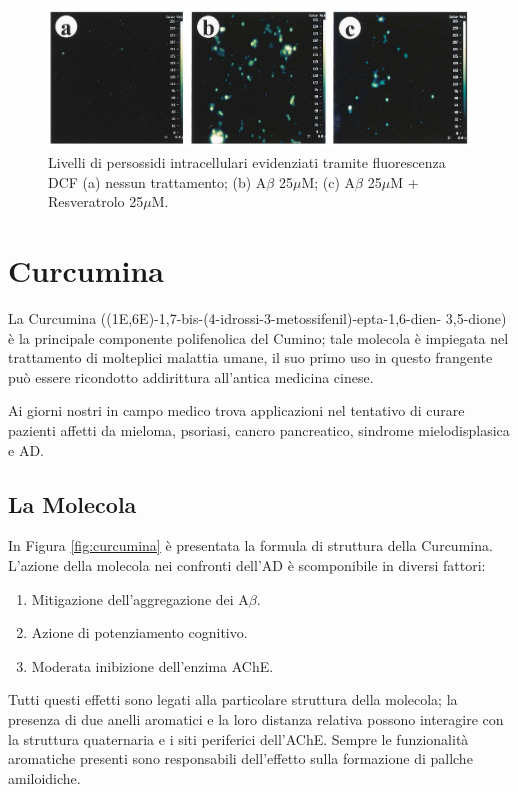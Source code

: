 \documentclass[a4paper, 12pt]{article}
\begin{document}
\begin{figure}[H]
	\centering
	\includegraphics[width=\linewidth]{immagini/roi_resveratrolo.png}
	\caption{Livelli di persossidi intracellulari evidenziati tramite fluorescenza DCF (a) nessun trattamento; (b) A$\beta$ 25$\mu$M; (c) A$\beta$ 25$\mu$M + Resveratrolo 25$\mu$M.}
	\label{fig:roi_resveratrolo}
\end{figure}

\section{Curcumina}
\label{sec:curc}
La Curcumina ((1E,6E)-1,7-bis-(4-idrossi-3-metossifenil)-epta-1,6-dien- 3,5-dione) è la principale componente polifenolica del Cumino; tale molecola è impiegata nel trattamento di molteplici malattia umane, il suo primo uso in questo frangente può essere ricondotto addirittura all'antica medicina cinese.

Ai giorni nostri in campo medico trova applicazioni nel tentativo di curare pazienti affetti da mieloma, psoriasi, cancro pancreatico, sindrome mielodisplasica e AD.

\subsection{La Molecola}
In Figura \ref{fig:curcumina} è presentata la formula di struttura della Curcumina. L'azione della molecola nei confronti dell'AD è scomponibile in diversi fattori:

\begin{enumerate}
	\item Mitigazione dell'aggregazione dei A$\beta$.
	\item Azione di potenziamento cognitivo.
	\item Moderata inibizione dell'enzima AChE.
\end{enumerate}

Tutti questi effetti sono legati alla particolare struttura della molecola; la presenza di due anelli aromatici e la loro distanza relativa possono interagire con la struttura quaternaria  e i siti periferici dell'AChE. Sempre le funzionalità aromatiche presenti sono responsabili dell'effetto sulla formazione di pallche amiloidiche.
\end{document}
